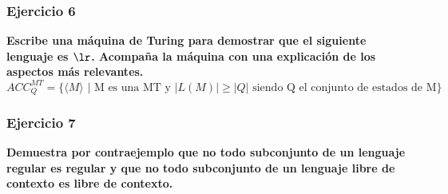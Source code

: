 \documentclass{article}
\begin{document}
%

\subsubsection*{Ejercicio 6}
\textbf{Escribe  una máquina de Turing para demostrar que el siguiente lenguaje es $\lr$. Acompaña la máquina con una explicación de los aspectos más relevantes.}
$$ACC_{Q}^{MT}=\{\langle M \rangle \mbox{ | M es una MT y } |L(M)| \geq |Q| \mbox{ siendo Q el conjunto de estados de M}\}$$

%


\subsubsection*{Ejercicio 7}\textbf{Demuestra por contraejemplo que no todo subconjunto de un lenguaje regular es regular y que no todo subconjunto de un lenguaje libre de contexto  es libre de contexto.}\\
\end{document}
